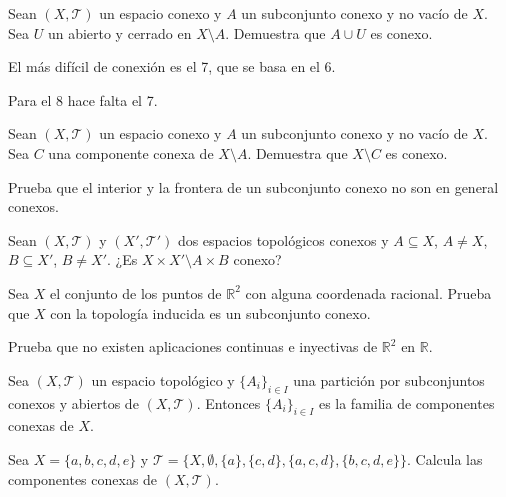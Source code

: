 \begin{ejercicio}
Sean \((X, \mathcal{T})\) un espacio conexo y \(A\) un subconjunto conexo y no vacío de \(X\). Sea \(U\) un abierto y cerrado en \(X \setminus A\). Demuestra que \(A \cup U\) es conexo.



El más difícil de conexión es el 7, que se basa en el 6.

Para el 8 hace falta el 7.
\end{ejercicio}

\begin{ejercicio}
Sean \((X, \mathcal{T})\) un espacio conexo y \(A\) un subconjunto conexo y no vacío de \(X\). Sea \(C\) una componente conexa de \(X \setminus A\). Demuestra que \(X \setminus C\) es conexo.
\end{ejercicio}

\begin{ejercicio}
Prueba que el interior y la frontera de un subconjunto conexo no son en general conexos.
\end{ejercicio}

\begin{ejercicio}
Sean \((X, \mathcal{T})\) y \((X', \mathcal{T'})\) dos espacios topológicos conexos y \(A \subseteq X\), \(A\neq X\), \(B \subseteq X'\), \(B\neq X'\). ¿Es \(X \times X' \setminus A \times B\) conexo?
\end{ejercicio}

\begin{ejercicio}
Sea \(X\) el conjunto de los puntos de \( \mathbb{R}^2 \) con alguna coordenada racional. Prueba que \(X\) con la topología inducida es un subconjunto conexo.
\end{ejercicio}

\begin{ejercicio}
Prueba que no existen aplicaciones continuas e inyectivas de \( \mathbb{R}^2 \) en \( \mathbb{R} \).
\end{ejercicio}

\begin{ejercicio}
Sea \((X, \mathcal{T})\) un espacio topológico y \(\{A_i\}_{i \in I}\) una partición por subconjuntos conexos y abiertos de \((X, \mathcal{T})\). Entonces \(\{A_i\}_{i \in I}\) es la familia de componentes conexas de \(X\).
\end{ejercicio}



\begin{ejercicio}
Sea \( X = \{a, b, c, d, e\} \) y \( \mathcal{T} = \{X, \emptyset, \{a\}, \{c, d\}, \{a, c, d\}, \{b, c, d, e\}\} \). Calcula las componentes conexas de \((X, \mathcal{T})\).
\end{ejercicio}

